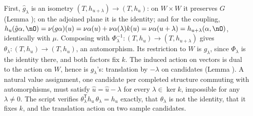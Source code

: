 First, $\hat g_\lambda$ is an isometry $(T, h_{u+\lambda}) \to (T, h_u)$: on $W \times W$ it preserves $G$ (Lemma ); on the adjoined plane it is the identity; and for the coupling, $h_u(\hat g\alpha, \nO) = \nu(g\alpha)(u) = \nu\alpha(u) + \nu\alpha(\lambda)k(u) = \nu\alpha(u + \lambda) = h_{u+\lambda}(\alpha, \nO)$, identically with $\mu$. Composing with $\Phi_\lambda^{-1} : (T, h_u) \to (T, h_{u+\lambda})$ gives $\theta_\lambda : (T, h_u) \to (T, h_u)$, an automorphism. Its restriction to $W$ is $g_\lambda$, since $\Phi_\lambda$ is the identity there, and both factors fix $k$. The induced action on vectors is dual to the action on $W$, hence is $g_\lambda$'s: translation by $-\lambda$ on candidates (Lemma ). A natural value assignment, one candidate per completed structure commuting with automorphisms, must satisfy $\hat u = \hat u - \lambda$ for every $\lambda \in \ker k$, impossible for any $\lambda \neq 0$. The script verifies $\theta_\lambda^{\mathsf{T}} h_u\, \theta_\lambda = h_u$ exactly, that $\theta_\lambda$ is not the identity, that it fixes $k$, and the translation action on two sample candidates.
